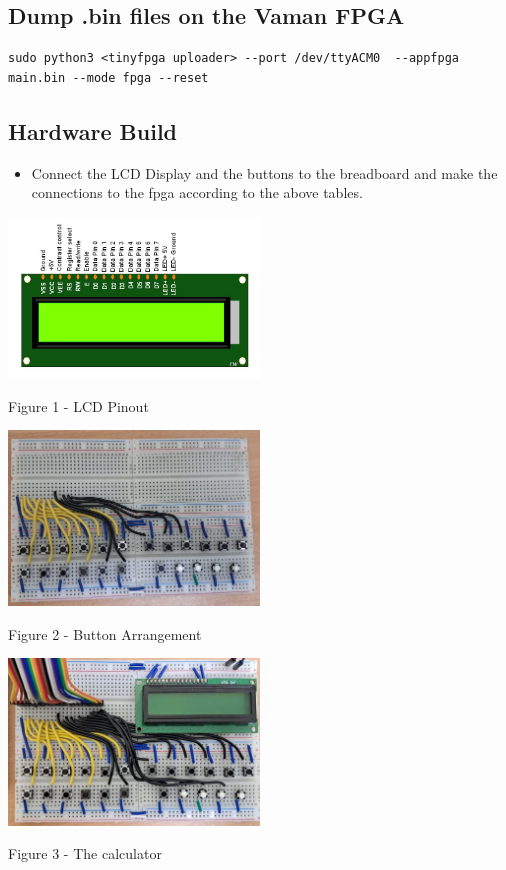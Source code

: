 \documentclass[conference]{IEEEtran}
\begin{document}
\begin{FlushLeft}
\subsection{Dump .bin files on the Vaman FPGA}
\begin{footnotesize}
\begin{lstlisting}
sudo python3 <tinyfpga uploader> --port /dev/ttyACM0  --appfpga main.bin --mode fpga --reset
\end{lstlisting}
\end{footnotesize}

\subsection{Hardware Build}
\begin{itemize}
    \item Connect the LCD Display and the buttons to the breadboard and make the connections to the fpga according to the above tables.
\end{itemize}
\includegraphics[width=0.5\textwidth]{figs/lcd.png}
\centerline{Figure 1 -  LCD Pinout}
\includegraphics[width=0.5\textwidth]{figs/buttons.jpeg}
\centerline{Figure 2 -  Button Arrangement}
\includegraphics[width=0.5\textwidth]{figs/final.jpeg}
\centerline{Figure 3 -  The calculator}

\end{FlushLeft}
\end{document}
